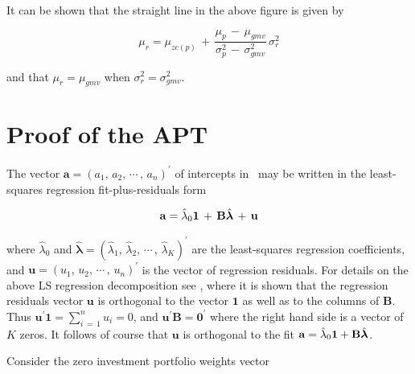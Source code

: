 \documentclass[graybox,envcountchap,sectrefs]{svmono}\usepackage[]{graphicx}\usepackage[]{xcolor}
\begin{document}
\begin{appendices}
\begin{figure}[H]
\label{fig: zero-covariancePortfolioGeometry}
\end{figure}

It can be shown that the straight line in the above figure is given
by

\begin{equation}
\mu_{r}=\mu_{zc(p)}\,+\,\dfrac{\mu_{p}\,-\,\mu_{gmv}}{\sigma_{p}^{2}\,-\,\sigma_{gmv}^{2}}\,\sigma_{r}^{2}\label{eq: zc(p) geometry}
\end{equation}

and that $\mu_{r}=\mu_{gmv}$ when $\sigma_{r}^{2}=\sigma_{gmv}^{2}$.

\section{Proof of the APT\label{sec: APTproof}}

The vector $\mathbf{a}=(a_{1},\,a_{2},\,\cdots\,,\,a_{n})^{\prime}$
of intercepts in \APTintercepts\  may be written in the least-squares
regression fit-plus-residuals form

\begin{equation}
\begin{alignedat}{1}\mathbf{a} & =\hat{\lambda}_{0}\mathbf{1}\,+\,\text{\ensuremath{\mathbf{B}}\ensuremath{\ensuremath{\hat{\boldsymbol{\lambda}}}}}\,+\,\ensuremath{\mathbf{u}}\end{alignedat}
\label{eq: LSregression-avec-on-Bmat}
\end{equation}

where $\hat{\lambda}_{0}$ and $\hat{\boldsymbol{\lambda}}=(\hat{\lambda}_{1},\,\hat{\lambda}_{2},\,\cdots\,,\,\hat{\lambda}_{K})^{\prime}$
are the least-squares regression coefficients, and $\ensuremath{\mathbf{u}}=(u_{1},\,u_{2},\,\cdots\,,\,u_{n})^{\prime}$
is the vector of regression residuals. For details on the above LS
regression decomposition see \LeastSquaresSection, where it is shown
that the regression residuals vector $\ensuremath{\mathbf{u}}$ is
orthogonal to the vector $\mathbf{1}$ as well as to the columns of
$\mathbf{B}$. Thus $\mathbf{u}^{\prime}\mathbf{1}=\sum_{i\,=\,1}^{n}u_{i}=0$,
and $\mathbf{u}^{\prime}\mathbf{B}=\mathbf{0}^{\prime}$ where the
right hand side is a vector of $K$ zeros. It follows of course that
$\mathbf{u}$ is orthogonal to the fit $\mathbf{a}=\hat{\lambda}_{0}\mathbf{1}+\text{\ensuremath{\mathbf{B}}\ensuremath{\ensuremath{\hat{\boldsymbol{\lambda}}}}}$.

Consider the zero investment portfolio weights vector


\end{appendices}
\end{document}
